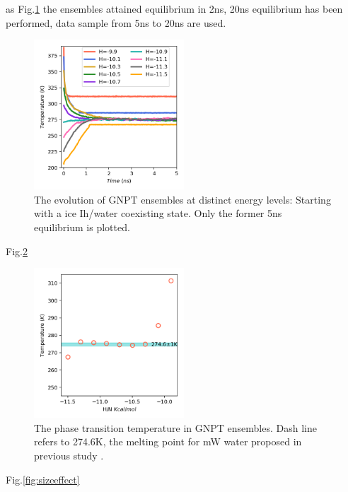 \documentclass[aps,prl,twocolumn,superscriptaddress]{revtex4-1}
\begin{document}
as Fig.\ref{fig:evolution}
the ensembles attained equilibrium in 2ns, 20ns equilibrium has been performed, data sample from 5ns to 20ns are used. 
\begin{figure}[ht]
\centering{}\includegraphics[width=0.5\textwidth]{PoteScan.png} 
\caption{The evolution of GNPT ensembles at distinct energy levels: Starting with a ice Ih/water coexisting state. Only the former 5ns equilibrium is plotted.
\label{fig:evolution} }
\end{figure}
Fig.\ref{fig:PTtemp-mw}
\begin{figure}[ht]
\centering{}\includegraphics[width=0.5\textwidth]{PTtemp-mw.png} 
\caption{The phase transition temperature in GNPT ensembles. Dash line refers to 274.6K, the melting point for mW water proposed in previous study \cite{Molinero2009} . 
\label{fig:PTtemp-mw}} 
\end{figure}
Fig.\ref{fig:sizeeffect}
\end{document}
